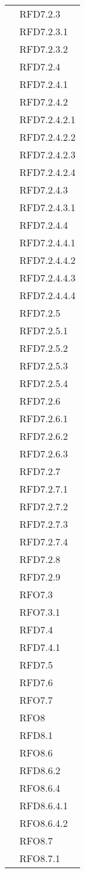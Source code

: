 \begin{longtable}{|>{\centering}m{10cm}|m{3cm}<{\centering}|}
& RFD7.2.3\\
& RFD7.2.3.1\\
& RFD7.2.3.2\\
& RFD7.2.4\\
& RFD7.2.4.1\\
& RFD7.2.4.2\\
& RFD7.2.4.2.1\\
& RFD7.2.4.2.2\\
& RFD7.2.4.2.3\\
& RFD7.2.4.2.4\\
& RFD7.2.4.3\\
& RFD7.2.4.3.1\\
& RFD7.2.4.4\\
& RFD7.2.4.4.1\\
& RFD7.2.4.4.2\\
& RFD7.2.4.4.3\\
& RFD7.2.4.4.4\\
& RFD7.2.5\\
& RFD7.2.5.1\\
& RFD7.2.5.2\\
& RFD7.2.5.3\\
& RFD7.2.5.4\\
& RFD7.2.6\\
& RFD7.2.6.1\\
& RFD7.2.6.2\\
& RFD7.2.6.3\\
& RFD7.2.7\\
& RFD7.2.7.1\\
& RFD7.2.7.2\\
& RFD7.2.7.3\\
& RFD7.2.7.4\\
& RFD7.2.8\\
& RFD7.2.9\\
& RFO7.3\\
& RFO7.3.1\\
& RFD7.4\\
& RFD7.4.1\\
& RFD7.5\\
& RFD7.6\\
& RFO7.7\\
& RFO8\\
& RFD8.1\\
& RFO8.6\\
& RFD8.6.2\\
& RFO8.6.4\\
& RFD8.6.4.1\\
& RFO8.6.4.2\\
& RFO8.7\\
& RFO8.7.1\\

\end{longtable}
